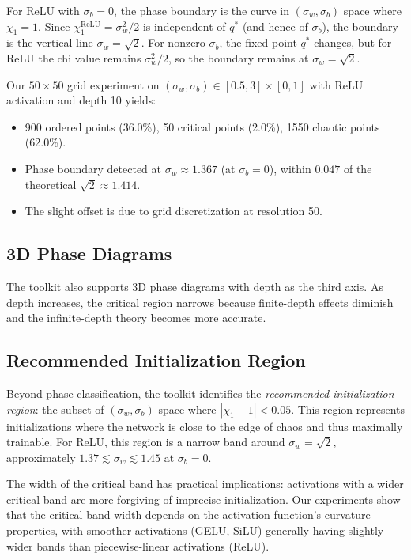 \documentclass[10pt]{article}
\theoremstyle{definition}
\begin{document}
For ReLU with $\sigma_b = 0$, the phase boundary is the curve in $(\sigma_w, \sigma_b)$ space where $\chi_1 = 1$.
Since $\chi_1^{\text{ReLU}} = \sigma_w^2/2$ is independent of $q^*$ (and hence of $\sigma_b$), the boundary is the vertical line $\sigma_w = \sqrt{2}$.
For nonzero $\sigma_b$, the fixed point $q^*$ changes, but for ReLU the chi value remains $\sigma_w^2/2$, so the boundary remains at $\sigma_w = \sqrt{2}$.

Our $50 \times 50$ grid experiment on $(\sigma_w, \sigma_b) \in [0.5, 3] \times [0, 1]$ with ReLU activation and depth 10 yields:
\begin{itemize}[nosep]
  \item 900 ordered points (36.0\%), 50 critical points (2.0\%), 1550 chaotic points (62.0\%).
  \item Phase boundary detected at $\sigma_w \approx 1.367$ (at $\sigma_b = 0$), within $0.047$ of the theoretical $\sqrt{2} \approx 1.414$.
  \item The slight offset is due to grid discretization at resolution 50.
\end{itemize}

\subsection{3D Phase Diagrams}

The toolkit also supports 3D phase diagrams with depth as the third axis.
As depth increases, the critical region narrows because finite-depth effects diminish and the infinite-depth theory becomes more accurate.

\subsection{Recommended Initialization Region}

Beyond phase classification, the toolkit identifies the \emph{recommended initialization region}: the subset of $(\sigma_w, \sigma_b)$ space where $|\chi_1 - 1| < 0.05$.
This region represents initializations where the network is close to the edge of chaos and thus maximally trainable.
For ReLU, this region is a narrow band around $\sigma_w = \sqrt{2}$, approximately $1.37 \lesssim \sigma_w \lesssim 1.45$ at $\sigma_b = 0$.

The width of the critical band has practical implications: activations with a wider critical band are more forgiving of imprecise initialization.
Our experiments show that the critical band width depends on the activation function's curvature properties, with smoother activations (GELU, SiLU) generally having slightly wider bands than piecewise-linear activations (ReLU).
\end{document}
